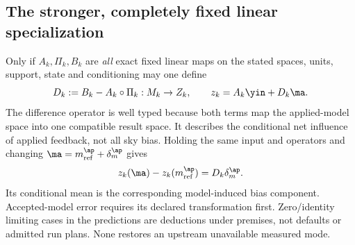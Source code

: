 {{\subsection*{The stronger, completely fixed linear specialization}
Only if $A_k,\Pi_k,B_k$ are \emph{all} exact fixed linear maps on the stated
spaces, units, support, state and conditioning may one define
\begin{equation}
D_k:=B_k-A_k\circ\Pi_k:M_k\to Z_k,\qquad
z_k=A_k\yin+D_k\ma.
\label{eq:linear}\end{equation}
The difference operator is well typed because both terms map the applied-model
space into one compatible result space. It describes the conditional net
influence of applied feedback, not all sky bias. Holding the same input and
operators and changing $\ma=m_{\rm ref}^{\ap}+\delta_m^{\ap}$ gives
\begin{equation}
z_k(\ma)-z_k(m_{\rm ref}^{\ap})=D_k\delta_m^{\ap}.
\label{eq:modelerror}\end{equation}
Its conditional mean is the corresponding model-induced bias component.
Accepted-model error requires its declared transformation first. Zero/identity
limiting cases in the predictions are deductions under premises, not defaults
or admitted run plans. None restores an upstream unavailable measured mode.
}}
